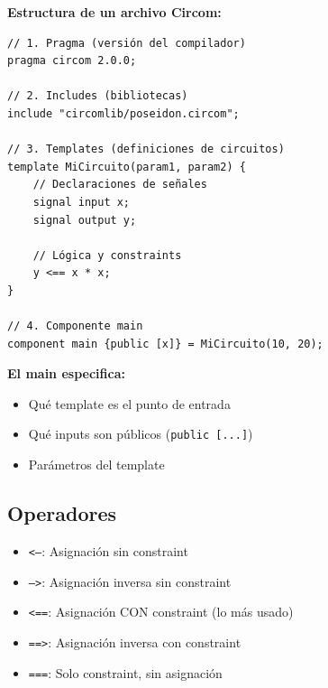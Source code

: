 \documentclass[11pt,a4paper,twoside,openright]{book}
\theoremstyle{definition}
\theoremstyle{plain}
\theoremstyle{remark}
\begin{document}
\begin{mathnote}
\textbf{Estructura de un archivo Circom:}

\begin{verbatim}
// 1. Pragma (versión del compilador)
pragma circom 2.0.0;

// 2. Includes (bibliotecas)
include "circomlib/poseidon.circom";

// 3. Templates (definiciones de circuitos)
template MiCircuito(param1, param2) {
    // Declaraciones de señales
    signal input x;
    signal output y;
    
    // Lógica y constraints
    y <== x * x;
}

// 4. Componente main
component main {public [x]} = MiCircuito(10, 20);
\end{verbatim}

\textbf{El main especifica:}
\begin{itemize}
    \item Qué template es el punto de entrada
    \item Qué inputs son públicos (\texttt{public [...]})
    \item Parámetros del template
\end{itemize}
\end{mathnote}

\subsection{Operadores}

\begin{itemize}
    \item \texttt{<--}: Asignación sin constraint
    \item \texttt{-->}: Asignación inversa sin constraint
    \item \texttt{<==}: Asignación CON constraint (lo más usado)
    \item \texttt{==>}: Asignación inversa con constraint
    \item \texttt{===}: Solo constraint, sin asignación
\end{itemize}
\end{document}
